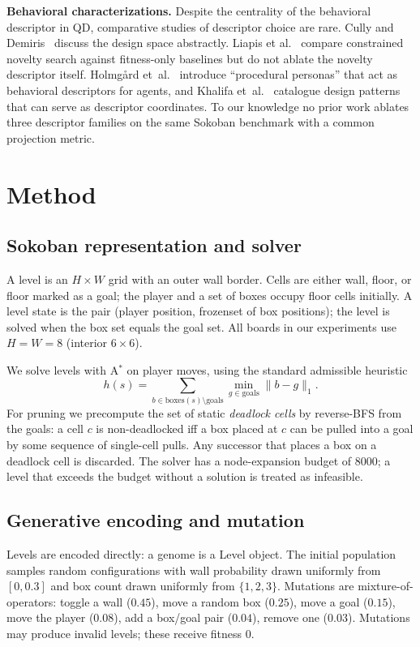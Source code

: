 \documentclass[conference]{IEEEtran}
\begin{document}
\textbf{Behavioral characterizations.} Despite the centrality of the
behavioral descriptor in QD, comparative studies of descriptor choice
are rare. Cully and Demiris~\cite{cully2017qd} discuss the design
space abstractly. Liapis et al.~\cite{liapis2015constrained} compare
constrained novelty search against fitness-only baselines but do not
ablate the novelty descriptor itself. Holmg\aa rd
et~al.~\cite{holmgard2014personas} introduce ``procedural personas''
that act as behavioral descriptors for agents, and Khalifa
et~al.~\cite{khalifa2019patterns} catalogue design patterns that can
serve as descriptor coordinates. To our knowledge no prior work
ablates three descriptor families on the same Sokoban benchmark with
a common projection metric.

\section{Method}
\label{sec:method}

\subsection{Sokoban representation and solver}

A level is an $H \times W$ grid with an outer wall border. Cells are
either wall, floor, or floor marked as a goal; the player and a set
of boxes occupy floor cells initially. A level state is the pair
(player position, frozenset of box positions); the level is solved
when the box set equals the goal set. All boards in our experiments
use $H = W = 8$ (interior $6 \times 6$).

We solve levels with A$^*$ on player moves, using the standard
admissible heuristic
\[
    h(s) = \sum_{b \in \text{boxes}(s) \setminus \text{goals}}
            \min_{g \in \text{goals}} \|b - g\|_1.
\]
For pruning we precompute the set of static \emph{deadlock cells} by
reverse-BFS from the goals: a cell $c$ is non-deadlocked iff a box
placed at $c$ can be pulled into a goal by some sequence of
single-cell pulls. Any successor that places a box on a deadlock
cell is discarded. The solver has a node-expansion budget of 8000;
a level that exceeds the budget without a solution is treated as
infeasible.

\subsection{Generative encoding and mutation}

Levels are encoded directly: a genome is a Level object. The
initial population samples random configurations with wall
probability drawn uniformly from $[0, 0.3]$ and box count drawn
uniformly from $\{1, 2, 3\}$. Mutations are mixture-of-operators:
toggle a wall ($0.45$), move a random box ($0.25$), move a goal
($0.15$), move the player ($0.08$), add a box/goal pair ($0.04$),
remove one ($0.03$). Mutations may produce invalid levels; these
receive fitness $0$.
\end{document}
